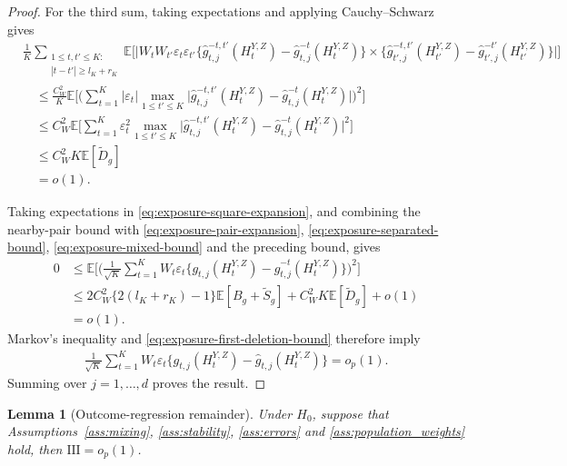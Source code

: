\documentclass[12pt]{article}
\def\E{\mathbb{E}}
\newtheorem{lemma}[theorem]{Lemma}
\numberwithin{equation}{section}
\begin{document}
\begin{proof}
For the third sum, taking expectations and applying Cauchy--Schwarz gives
\begin{align*}
&\frac1K\sum_{\substack{1\leq t,t'\leq K:\\
                      |t-t'|\geq l_K+r_K}}
\E\Big[\Big|
W_tW_{t'}\varepsilon_t\varepsilon_{t'}
\big\{\hat g_{t,j}^{-t,t'}(H_t^{Y,Z})
      -\hat g_{t,j}^{-t}(H_t^{Y,Z})\big\}\times
\big\{\hat g_{t',j}^{-t,t'}(H_{t'}^{Y,Z})
      -\hat g_{t',j}^{-t'}(H_{t'}^{Y,Z})\big\}
\Big|\Big]\\
&\quad\leq\frac{C_W^2}{K}
\E\Big[
\Big(\sum_{t=1}^K|\varepsilon_t|
\max_{1\leq t'\leq K}
\big|\hat g_{t,j}^{-t,t'}(H_t^{Y,Z})
     -\hat g_{t,j}^{-t}(H_t^{Y,Z})\big|
\Big)^2
\Big]\\
&\quad\leq C_W^2
\E\Big[
\sum_{t=1}^K\varepsilon_t^2
\max_{1\leq t'\leq K}
\big|\hat g_{t,j}^{-t,t'}(H_t^{Y,Z})
     -\hat g_{t,j}^{-t}(H_t^{Y,Z})\big|^2
\Big]\\
&\quad\leq C_W^2K\E[\tilde D_g]\\
&\quad=o(1).
\end{align*}

Taking expectations in \eqref{eq:exposure-square-expansion},
and combining the nearby-pair bound with
\eqref{eq:exposure-pair-expansion},
\eqref{eq:exposure-separated-bound},
\eqref{eq:exposure-mixed-bound} and the preceding bound, gives
\begin{align*}
0
&\leq\E\Big[
\Big(\frac1{\sqrt K}\sum_{t=1}^K W_t\varepsilon_t
\big\{g_{t,j}(H_t^{Y,Z})
      -\hat g_{t,j}^{-t}(H_t^{Y,Z})\big\}
\Big)^2
\Big]\\
&\leq
2C_W^2\{2(l_K+r_K)-1\}\E[B_g+\tilde S_g]
+C_W^2K\E[\tilde D_g]+o(1)\\
&=o(1).
\end{align*}
Markov's inequality and
\eqref{eq:exposure-first-deletion-bound} therefore imply
\begin{equation}
\label{eq:termII-converge}
\begin{aligned}
\frac1{\sqrt K}\sum_{t=1}^K W_t\varepsilon_t
\big\{g_{t,j}(H_t^{Y,Z})
      -\hat g_{t,j}(H_t^{Y,Z})\big\}
=o_p(1).
\end{aligned}
\end{equation}
Summing over \(j=1,\ldots,d\) proves the result.
\end{proof}

\begin{lemma}[Outcome-regression remainder]
\label{lem:outcome-remainder-moments}
Under \(H_0\), suppose that Assumptions~\ref{ass:mixing},
\ref{ass:stability}, \ref{ass:errors} and
\ref{ass:population_weights} hold,
then \(\mathrm{III}=o_p(1)\). 
\end{lemma}
\end{document}
